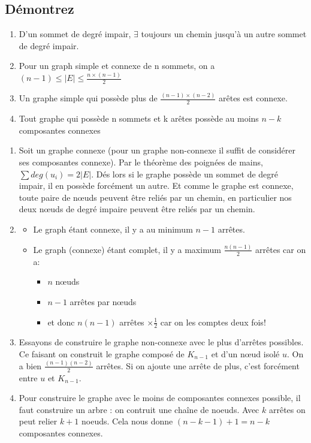 \subsection{Démontrez}
\begin{enumerate}
\item{D'un sommet de degré impair, $\exists$ toujours un chemin jusqu'à un autre sommet de degré impair.}
\item{Pour un graph simple et connexe de n sommets, on a $(n-1) \leq |E| \leq \frac{n \times (n-1)}{2}$}
\item{Un graphe simple qui possède plus de $\frac{(n-1) \times (n-2)}{2}$ arêtes est connexe.}
\item{Tout graphe qui possède n sommets et k arêtes possède au moins $n-k$ composantes connexes}
\end{enumerate}

\begin{solution}
\begin{enumerate}
\item{Soit un graphe connexe (pour un graphe non-connexe il suffit de considérer ses composantes connexe). Par le théorème des poignées de mains, $\sum deg(u_i) = 2 |E|$. Dés lors si le graphe possède un sommet de degré impair, il en possède forcément un autre. Et comme le graphe est connexe, toute paire de nœuds peuvent être reliés par un chemin, en particulier nos deux nœuds de degré impaire peuvent être reliés par un chemin.}
\item{
	\begin{itemize}
	\item Le graph étant connexe, il y a au minimum $n-1$ arrêtes.
	\item Le graph (connexe) étant complet, il y a maximum $\frac{n (n-1)}{2}$ arrêtes car on a:
		\begin{itemize}
		\item $n$ nœuds
		\item $n-1$ arrêtes par nœuds
		\item et donc $n (n-1)$ arrêtes $\times \frac{1}{2}$ car on les comptes deux fois!
		\end{itemize}
	\end{itemize}	
}
\item{ Essayons de construire le graphe non-connexe avec le plus d'arrêtes possibles. Ce faisant on construit le graphe composé de $K_{n-1}$ et d'un nœud isolé $u$. On a bien $\frac{(n-1)(n-2)}{2}$ arrêtes. Si on ajoute une arrête de plus, c'est forcément entre $u$ et $K_{n-1}$.	
	}
\item{Pour construire le graphe avec le moins de composantes connexes possible, il faut construire un arbre : on contruit une chaîne de noeuds. Avec $k$ arrêtes on peut relier $k+1$ noeuds. Cela nous donne $(n-k-1)+1=n-k$ composantes connexes.}
\end{enumerate}
\end{solution}

